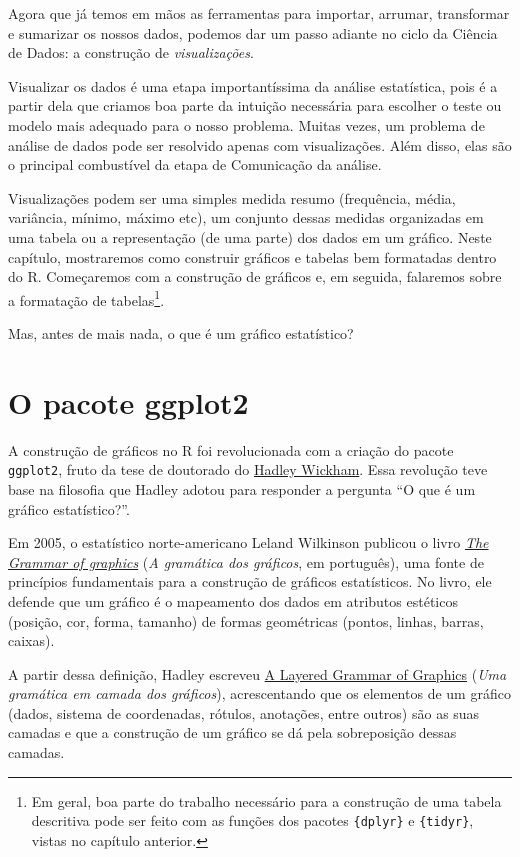 \documentclass[
]{book}
\begin{document}
Agora que já temos em mãos as ferramentas para importar, arrumar, transformar e sumarizar os nossos dados, podemos dar um passo adiante no ciclo da Ciência de Dados: a construção de \emph{visualizações}.

Visualizar os dados é uma etapa importantíssima da análise estatística, pois é a partir dela que criamos boa parte da intuição necessária para escolher o teste ou modelo mais adequado para o nosso problema. Muitas vezes, um problema de análise de dados pode ser resolvido apenas com visualizações. Além disso, elas são o principal combustível da etapa de Comunicação da análise.

Visualizações podem ser uma simples medida resumo (frequência, média, variância, mínimo, máximo etc), um conjunto dessas medidas organizadas em uma tabela ou a representação (de uma parte) dos dados em um gráfico. Neste capítulo, mostraremos como construir gráficos e tabelas bem formatadas dentro do R. Começaremos com a construção de gráficos e, em seguida, falaremos sobre a formatação de tabelas\footnote{Em geral, boa parte do trabalho necessário para a construção de uma tabela descritiva pode ser feito com as funções dos pacotes \texttt{\{dplyr\}} e \texttt{\{tidyr\}}, vistas no capítulo anterior.}.

Mas, antes de mais nada, o que é um gráfico estatístico?

\hypertarget{o-pacote-ggplot2}{%
\section{O pacote ggplot2}\label{o-pacote-ggplot2}}

A construção de gráficos no R foi revolucionada com a criação do pacote \texttt{ggplot2}, fruto da tese de doutorado do \href{https://github.com/hadley}{Hadley Wickham}. Essa revolução teve base na filosofia que Hadley adotou para responder a pergunta ``O que é um gráfico estatístico?''.

Em 2005, o estatístico norte-americano Leland Wilkinson publicou o livro \href{http://www.springer.com/statistics/computational+statistics/book/978-0-387-24544-7}{\emph{The Grammar of graphics}} (\emph{A gramática dos gráficos}, em português), uma fonte de princípios fundamentais para a construção de gráficos estatísticos. No livro, ele defende que um gráfico é o mapeamento dos dados em atributos estéticos (posição, cor, forma, tamanho) de formas geométricas (pontos, linhas, barras, caixas).

A partir dessa definição, Hadley escreveu \href{http://vita.had.co.nz/papers/layered-grammar.html}{A Layered Grammar of Graphics} (\emph{Uma gramática em camada dos gráficos}), acrescentando que os elementos de um gráfico (dados, sistema de coordenadas, rótulos, anotações, entre outros) são as suas camadas e que a construção de um gráfico se dá pela sobreposição dessas camadas.
\end{document}

